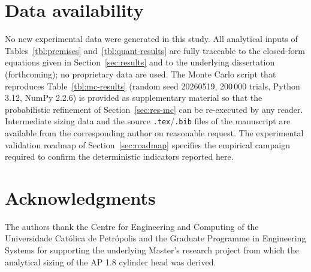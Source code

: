 \documentclass[preprint,12pt,a4paper]{elsarticle}
\let\oldsection\section
\renewcommand\section{\FloatBarrier\oldsection}
\begin{document}
\section*{Data availability}
No new experimental data were generated in this study. All analytical
inputs of Tables~\ref{tbl:premises} and~\ref{tbl:quant-results} are
fully traceable to the closed-form equations given in
Section~\ref{sec:results} and to the underlying
dissertation~\cite{porto2026dissertation} (forthcoming); no proprietary
data are used. The Monte Carlo script that reproduces
Table~\ref{tbl:mc-results} (random seed 20260519, 200\,000 trials,
Python 3.12, NumPy 2.2.6) is provided as supplementary material so that
the probabilistic refinement of Section~\ref{sec:res-mc} can be
re-executed by any reader. Intermediate sizing data and the source
\texttt{.tex}/\texttt{.bib} files of the manuscript are available from
the corresponding author on reasonable request. The experimental
validation roadmap of Section~\ref{sec:roadmap} specifies the empirical
campaign required to confirm the deterministic indicators reported
here.

\section*{Acknowledgments}
The authors thank the Centre for Engineering and Computing of the
Universidade Cat\'olica de Petr\'opolis and the Graduate Programme in
Engineering Systems for supporting the underlying Master's research
project from which the analytical sizing of the AP 1.8 cylinder
head was derived.




\end{document}
